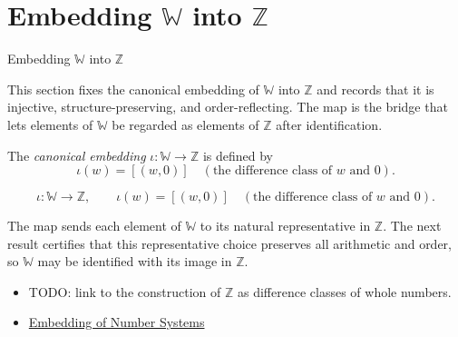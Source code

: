 \section{Embedding $\mathbb{W}$ into $\mathbb{Z}$}
\label{sec:embedding-w-into-z}

\begin{topicbox}{Embedding $\mathbb{W}$ into $\mathbb{Z}$}
\begin{exposition}
This section fixes the canonical embedding of $\mathbb{W}$ into $\mathbb{Z}$ and records that it is injective, structure-preserving, and order-reflecting. The map is the bridge that lets elements of $\mathbb{W}$ be regarded as elements of $\mathbb{Z}$ after identification.
\end{exposition}
\end{topicbox}
\begin{tcolorbox}[colback=defbox, colframe=defborder, arc=2pt,
  left=6pt, right=6pt, top=4pt, bottom=4pt,
  title={\small\textbf{Definition (Embedding $\mathbb{W}$ into $\mathbb{Z}$)}},
  fonttitle=\small\bfseries]
\begin{definition}
\label{def:embedding-w-into-z}
The \emph{canonical embedding} $\iota:\mathbb{W}\to \mathbb{Z}$ is defined by
\[
\iota(w)=[(w,0)] \quad(\text{the difference class of } w \text{ and } 0).
\]
\end{definition}
\end{tcolorbox}
\begin{remark*}
\[
\iota:\mathbb{W}\to \mathbb{Z},\qquad \iota(w)=[(w,0)] \quad(\text{the difference class of } w \text{ and } 0).
\]
\end{remark*}
\begin{remark*}[Interpretation]
The map sends each element of $\mathbb{W}$ to its natural representative in $\mathbb{Z}$. The next result certifies that this representative choice preserves all arithmetic and order, so $\mathbb{W}$ may be identified with its image in $\mathbb{Z}$.
\end{remark*}
\begin{dependencies}
\begin{itemize}
  \item TODO: link to the construction of $\mathbb{Z}$ as difference classes of whole numbers.
  \item \hyperref[def:number-system-embedding]{Embedding of Number Systems}
\end{itemize}
\end{dependencies}
